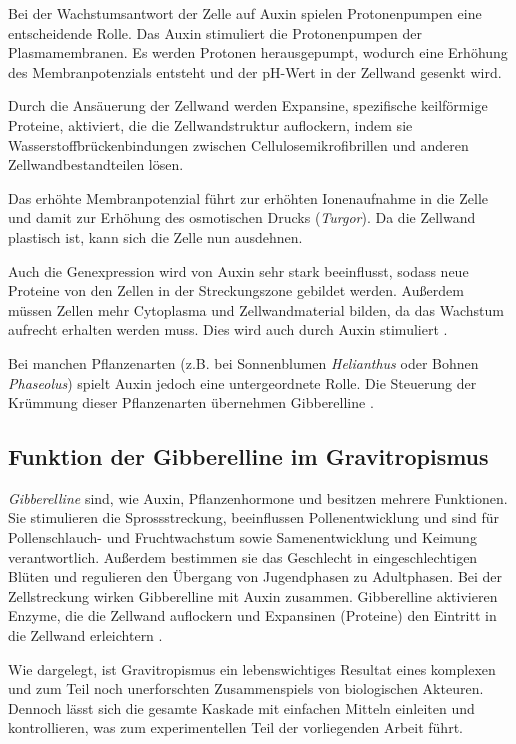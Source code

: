 \documentclass[
11pt, 
ngerman,
listof=totocnumbered,
oneside,
bibliography=totocnumbered,
abstracton
]{scrreprt}
\begin{document}
Bei der Wachstumsantwort der Zelle auf Auxin spielen Protonenpumpen eine entscheidende Rolle. Das Auxin stimuliert die Protonenpumpen der Plasmamembranen. Es werden Protonen herausgepumpt, wodurch eine Erhöhung des Membranpotenzials entsteht und der pH-Wert in der Zellwand gesenkt wird. 

Durch die Ansäuerung  der Zellwand werden Expansine, spezifische keilförmige Proteine, aktiviert, die die Zellwandstruktur auflockern, indem sie Wasserstoffbrückenbindungen zwischen Cellulosemikrofibrillen und anderen Zellwandbestandteilen lösen.

Das erhöhte Membranpotenzial führt zur erhöhten Ionenaufnahme in die Zelle und damit zur Erhöhung des osmotischen Drucks (\emph{Turgor}). Da die Zellwand plastisch ist, kann sich die Zelle nun ausdehnen. 

Auch die Genexpression wird von Auxin sehr stark beeinflusst, sodass neue Proteine von den Zellen in der Streckungszone gebildet werden.
Außerdem müssen Zellen mehr Cytoplasma und Zellwandmaterial bilden, da das Wachstum aufrecht erhalten werden muss. Dies wird auch durch Auxin stimuliert \parencite[1118ff]{campbell}.

Bei manchen Pflanzenarten (z.B. bei Sonnenblumen \emph{Helianthus} oder Bohnen \emph{Phaseolus}) spielt Auxin jedoch eine untergeordnete Rolle.
Die Steuerung der Krümmung dieser Pflanzenarten übernehmen Gibberelline \parencite[502--503]{Nultsch}.
 
\subsection{Funktion der Gibberelline im Gravitropismus}

\emph{Gibberelline} sind, wie Auxin, Pflanzenhormone und besitzen mehrere Funktionen. 
Sie stimulieren die Sprossstreckung, beeinflussen Pollenentwicklung und sind für Pollenschlauch- und Fruchtwachstum sowie Samenentwicklung und Keimung verantwortlich. Außerdem bestimmen sie das Geschlecht in eingeschlechtigen Blüten und regulieren den Übergang von Jugendphasen zu Adultphasen. 
Bei der Zellstreckung wirken Gibberelline mit Auxin zusammen. Gibberelline aktivieren Enzyme, die die Zellwand auflockern und Expansinen (Proteine) den Eintritt in die Zellwand erleichtern \parencite[1122--1123]{campbell}.

 
Wie dargelegt, ist Gravitropismus ein lebenswichtiges Resultat eines komplexen und zum Teil noch unerforschten Zusammenspiels von biologischen Akteuren. Dennoch lässt sich die gesamte Kaskade mit einfachen Mitteln einleiten und kontrollieren, was zum experimentellen Teil der vorliegenden Arbeit führt. 
\end{document}
